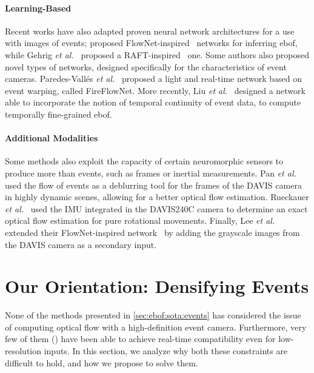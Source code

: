 \paragraph{Learning-Based} Recent works have also adapted proven neural network architectures for a use with images of events; \cite{Zhu2018EVFlowNetSO,Lee2020SpikeFlowNetEO} proposed FlowNet-inspired~\cite{Dosovitskiy2015FlowNetLO} networks for inferring \acrshort{ebof}, while Gehrig \textit{et al.}~\cite{Gehrig2021DenseOF} proposed a RAFT-inspired~\cite{Teed2020RAFTRA} one. Some authors also proposed novel types of networks, designed specifically for the characteristics of event cameras. Paredes-Vallés \textit{et al.}~\cite{ParedesValls2021BackTE} proposed a light and real-time network based on event warping, called FireFlowNet. More recently, Liu \textit{et al.}~\cite{Liu2023TMATM} designed a network able to incorporate the notion of temporal continuity of event data, to compute temporally fine-grained \acrshort{ebof}.

\paragraph{Additional Modalities} Some methods also exploit the capacity of certain neuromorphic sensors to produce more than events, such as frames or inertial measurements. Pan \textit{et al.}~\cite{Pan2020SingleIO} used the flow of events as a deblurring tool for the frames of the DAVIS camera in highly dynamic scenes, allowing for a better optical flow estimation. Rueckauer \textit{et al.}~\cite{Rueckauer2016EvaluationOE} used the IMU integrated in the DAVIS240C camera to determine an exact optical flow estimation for pure rotational movements. Finally, Lee \textit{et al.}~\cite{Lee2021FusionFlowNetEO} extended their FlowNet-inspired network~\cite{Lee2020SpikeFlowNetEO} by adding the grayscale images from the DAVIS camera as a secondary input.


\section{Our Orientation: Densifying Events}\label{sec:ebof:ourorientation}
None of the methods presented in \cref{sec:ebof:sota:events} has considered the issue of computing optical flow with a high-definition event camera. Furthermore, very few of them (\cite{ParedesValls2021BackTE,Liu2020GloballyOC,Rueckauer2016EvaluationOE,Akolkar2020SeeBY}) have been able to achieve real-time compatibility even for low-resolution inputs. In this section, we analyze why both these constraints are difficult to hold, and how we propose to solve them.

